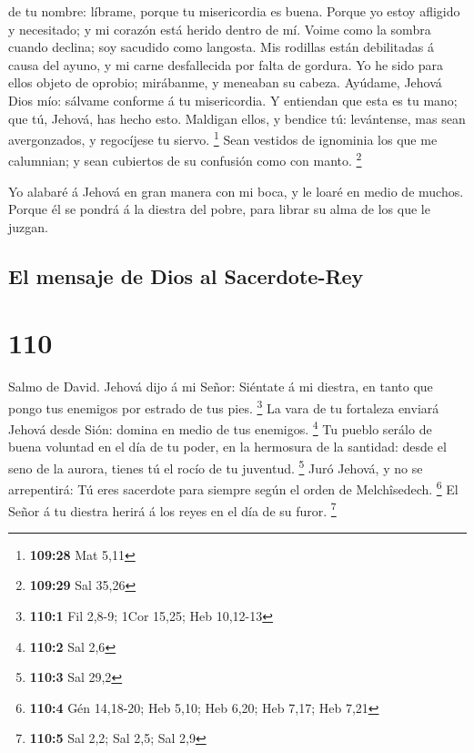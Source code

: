 de tu nombre: líbrame, porque tu misericordia es buena. 
Porque yo estoy afligido y necesitado; y mi corazón está herido dentro
de mí.  Voime como la sombra cuando declina; soy sacudido
como langosta.  Mis rodillas están debilitadas á causa del
ayuno, y mi carne desfallecida por falta de gordura.  Yo he
sido para ellos objeto de oprobio; mirábanme, y meneaban su cabeza.
 Ayúdame, Jehová Dios mío: sálvame conforme á tu
misericordia.  Y entiendan que esta es tu mano; que tú,
Jehová, has hecho esto.  Maldigan ellos, y bendice tú:
levántense, mas sean avergonzados, y regocíjese tu siervo. \footnote{\textbf{109:28}
  Mat 5,11}  Sean vestidos de ignominia los que me
calumnian; y sean cubiertos de su confusión como con manto. \footnote{\textbf{109:29}
  Sal 35,26}

 Yo alabaré á Jehová en gran manera con mi boca, y le loaré
en medio de muchos.  Porque él se pondrá á la diestra del
pobre, para librar su alma de los que le juzgan.

\hypertarget{el-mensaje-de-dios-al-sacerdote-rey}{%
\subsection{El mensaje de Dios al
Sacerdote-Rey}\label{el-mensaje-de-dios-al-sacerdote-rey}}

\hypertarget{section-109}{%
\section{110}\label{section-109}}

 Salmo de David. Jehová dijo á mi Señor: Siéntate á mi
diestra, en tanto que pongo tus enemigos por estrado de tus pies.
\footnote{\textbf{110:1} Fil 2,8-9; 1Cor 15,25; Heb 10,12-13}
 La vara de tu fortaleza enviará Jehová desde Sión: domina
en medio de tus enemigos. \footnote{\textbf{110:2} Sal 2,6} 
Tu pueblo serálo de buena voluntad en el día de tu poder, en la
hermosura de la santidad: desde el seno de la aurora, tienes tú el rocío
de tu juventud. \footnote{\textbf{110:3} Sal 29,2}  Juró
Jehová, y no se arrepentirá: Tú eres sacerdote para siempre según el
orden de Melchîsedech. \footnote{\textbf{110:4} Gén 14,18-20; Heb 5,10;
  Heb 6,20; Heb 7,17; Heb 7,21}  El Señor á tu diestra
herirá á los reyes en el día de su furor. \footnote{\textbf{110:5} Sal
  2,2; Sal 2,5; Sal 2,9}

